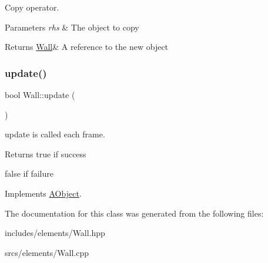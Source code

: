 Copy operator. 


\begin{DoxyParams}{Parameters}
{\em rhs} & The object to copy \\
\hline
\end{DoxyParams}
\begin{DoxyReturn}{Returns}
\hyperlink{class_wall}{Wall}\& A reference to the new object 
\end{DoxyReturn}
\mbox{\label{class_wall_a29d3c4daa11dbb20d758b1fc285ed7a4}} 
\subsubsection{\texorpdfstring{update()}{update()}}
{\footnotesize\ttfamily bool Wall\+::update (\begin{DoxyParamCaption}{ }\end{DoxyParamCaption})\hspace{0.3cm}{\ttfamily [virtual]}}



update is called each frame. 

\begin{DoxyReturn}{Returns}
true if success 

false if failure 
\end{DoxyReturn}


Implements \hyperlink{class_a_object_af35bb4b68af0a11bb1fcf617bde41ecd}{A\+Object}.



The documentation for this class was generated from the following files\+:\begin{DoxyCompactItemize}
\item 
includes/elements/Wall.\+hpp\item 
srcs/elements/Wall.\+cpp\end{DoxyCompactItemize}
